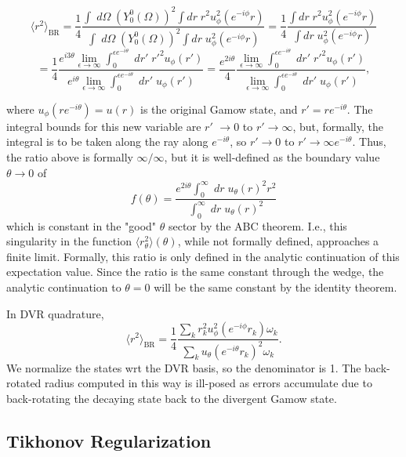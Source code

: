 $$
\langle r^2 \rangle_{\text{BR}} = \frac{1}{4}\frac{\int \;d\Omega\;(Y_0^0(\Omega))^2\int dr\;r^2 u_\phi^2 (e^{-i\phi}r)}{\int\;d\Omega\;(Y_0^0(\Omega))^2\int dr\;u_\phi^2 (e^{-i\phi}r)} = \frac{1}{4} \frac{\int dr\;r^2 u_\phi^2 (e^{-i\phi}r)}{\int dr\;u_\phi^2 (e^{-i\phi}r)}
$$
$$
=\frac{1}{4}\frac{e^{i3\theta}\lim_{\epsilon\rightarrow \infty}\int_0^{\epsilon e^{-i\theta}}\;dr'\;r'^2 u_\phi(r')}{e^{i\theta}\lim_{\epsilon\rightarrow \infty}\int_0^{\epsilon e^{-i\theta}}\;dr'\;u_\phi(r')}= \frac{e^{2i\theta}}{4}\frac{\lim_{\epsilon\rightarrow \infty}\int_0^{\epsilon e^{-i\theta}}\;dr'\;r'^2 u_\phi(r')}{\lim_{\epsilon\rightarrow \infty}\int_0^{\epsilon e^{-i\theta}}\;dr'\;u_\phi(r')},
$$

where $u_\phi(re^{-i\theta}) = u(r)$ is the original Gamow state, and $r'=re^{-i\theta}$. The integral bounds for this new variable are $r'$ $\rightarrow 0$ to $r'\rightarrow\infty$, but, formally, the integral is to be taken along the ray along $e^{-i\theta}$, so $r'\rightarrow 0$ to $r'\rightarrow \infty e^{-i\theta}$. Thus, the ratio above is formally $\infty/\infty$, but it is well-defined as the boundary value $\theta\rightarrow0$ of 
$$
f(\theta)=\frac{e^{2i\theta}\int^\infty_0\;dr\;u_\theta(r)^2r^2}{\int_0^\infty\;dr\; u_\theta(r)^2}
$$
which is constant in the "good" $\theta$ sector by the ABC theorem. I.e., this singularity in the function $\langle r^2_\theta\rangle(\theta)$, while not formally defined, approaches a finite limit. Formally, this ratio is only defined in the analytic continuation of this expectation value. Since the ratio is the same constant through the wedge, the analytic continuation to $\theta=0$ will be the same constant by the identity theorem.

In DVR quadrature,
$$
\langle r^2 \rangle_{\text{BR}} = \frac{1}{4}\frac{\sum_k r_k^2 u_\phi^2 (e^{-i\phi}r_k) \omega_k}{\sum_k u_\theta(e^{-i\theta}r_k)^2\omega_k}.
$$
We normalize the states wrt the DVR basis, so the denominator is 1. The back-rotated radius computed in this way is ill-posed as errors accumulate due to back-rotating the decaying state back to the divergent Gamow state.
\subsection{Tikhonov Regularization}

